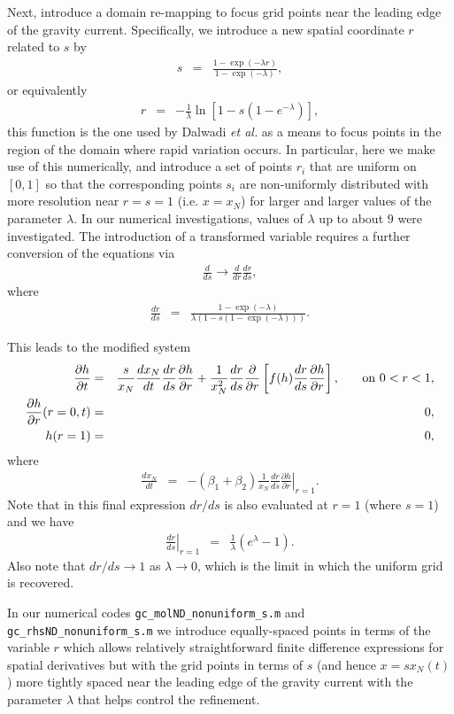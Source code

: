 \documentclass[11pt]{article}
\newcommand{\bea}{\begin{eqnarray}}
\newcommand{\eea}{\end{eqnarray}}
\begin{document}
Next, introduce a domain re-mapping to focus grid points near the leading edge of the gravity current.  Specifically, we introduce a new spatial coordinate $r$ related to $s$
by
\bea
s & = & \frac{1- \exp (-\lambda r)}{1 - \exp (-\lambda)},
\eea
or equivalently
\bea
r & = & - \frac{1}{\lambda} \ln \left[ 1 - s (1-e^{-\lambda}) \right],
\eea
this function is the one used by Dalwadi {\it et al.} \cite{Dalwadi_etal_2020} as a means to focus points in the region of the domain where rapid variation occurs.  In particular, 
here we make use of this numerically, and introduce a set of points $r_i$ that are uniform on $[0,1]$ so that the corresponding points $s_i$ are non-uniformly distributed with 
more resolution near $r=s=1$ (i.e. $x=x_N$) for larger and larger values of the parameter $\lambda$.  In our numerical investigations, values of $\lambda$ up to about $9$ were investigated.  
The introduction of a transformed variable requires a further conversion of the equations via 
\bea
\frac{d}{ds} \rightarrow \frac{d}{dr} \frac{dr}{ds},
\eea
where 
\bea
\frac{dr}{ds} & = & \frac{ 1 - \exp(-\lambda) } {\lambda  (1 - s(1 - \exp(-\lambda)))}.
\eea

This leads to the modified system
\bea
\label{eq:h_fixed_domain_drds}
\frac{\partial h}{\partial t} & = & \frac{s}{x_N} \frac{dx_N}{dt} \frac{dr}{ds} \frac{\partial h}{\partial r} + \frac{1}{x_N^2} \frac{dr}{ds} \frac{\partial}{\partial r} \left[ f(h) \frac{dr}{ds} \frac{\partial h}{\partial r} \right], \hspace{0.25in} \mbox{on $0 < r < 1$},\\
\label{eq:bc1_fixed_domain_drds}
\frac{\partial h}{\partial r}(r=0,t) & = & 0,\\
\label{eq:bc2_fixed_domain_drds}
h(r=1) & = & 0,
\eea
where
\bea
\label{eq:bc3_fixed_domain_drds}
\frac{dx_N}{dt} & = & - ( \beta_1 + \beta_2 ) \frac{1}{x_N} \frac{dr}{ds} \left. \frac{\partial h}{\partial r} \right|_{r=1}.
\eea
Note that in this final expression $dr/ds$ is also evaluated at $r=1$ (where $s=1$) and we have
\bea
\left. \frac{dr}{ds} \right|_{r=1} & = & \frac{1}{\lambda} \left( e^\lambda - 1 \right).
\eea
Also note that $dr/ds \rightarrow 1$ as $\lambda \rightarrow 0$, which is the limit in which the uniform grid is recovered.

In our numerical codes {\tt gc\_molND\_nonuniform\_s.m} and {\tt gc\_rhsND\_nonuniform\_s.m} we introduce equally-spaced points in terms of the variable $r$ which 
allows relatively straightforward finite difference expressions for spatial derivatives but with the grid points in terms of $s$ (and hence $x = s x_N(t)$) more tightly
spaced near the leading edge of the gravity current with the parameter $\lambda$ that helps control the refinement.
\end{document}

